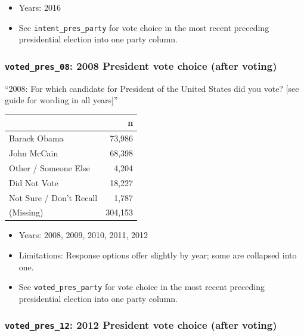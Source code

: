 \documentclass[10pt,article,oneside]{memoir}
\theoremstyle{definition}
\begin{document}
\begin{itemize}
\tightlist
\item
  Years: 2016
\item
  See \texttt{intent\_pres\_party} for vote choice in the most recent
  preceding presidential election into one party column.
\end{itemize}

\hypertarget{voted_pres_08-2008-president-vote-choice-after-voting}{%
\subsubsection{\texorpdfstring{\texttt{voted\_pres\_08}: 2008 President
vote choice (after
voting)}{voted\_pres\_08: 2008 President vote choice (after voting)}}\label{voted_pres_08-2008-president-vote-choice-after-voting}}

``2008: For which candidate for President of the United States did you
vote? {[}see guide for wording in all years{]}''

\begin{table}[H]
\centering
\begin{tabular}{lr}
\toprule
 & n\\
\midrule
Barack Obama & 73,986\\
John McCain & 68,398\\
Other / Someone Else & 4,204\\
Did Not Vote & 18,227\\
Not Sure / Don't Recall & 1,787\\
(Missing) & 304,153\\
\bottomrule
\end{tabular}
\end{table}

\begin{itemize}
\tightlist
\item
  Years: 2008, 2009, 2010, 2011, 2012
\item
  Limitations: Response options offer slightly by year; some are
  collapsed into one.
\item
  See \texttt{voted\_pres\_party} for vote choice in the most recent
  preceding presidential election into one party column.
\end{itemize}

\hypertarget{voted_pres_12-2012-president-vote-choice-after-voting}{%
\subsubsection{\texorpdfstring{\texttt{voted\_pres\_12}: 2012 President
vote choice (after
voting)}{voted\_pres\_12: 2012 President vote choice (after voting)}}\label{voted_pres_12-2012-president-vote-choice-after-voting}}
\end{document}
